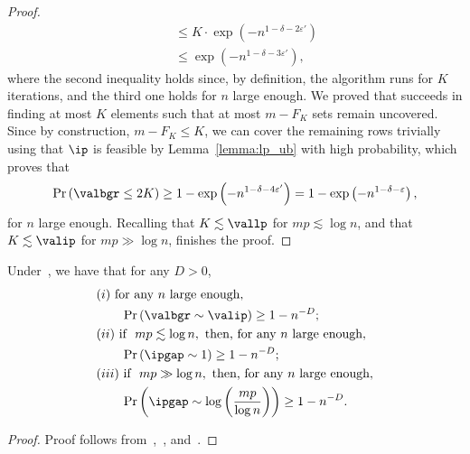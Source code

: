 \begin{proof}
\begin{align*}
&\quad \leq K \cdot \exp\left(- n^{1 - \delta - 2\varepsilon'}\right) \\
&\quad \leq \exp\left(- n^{1 - \delta - 3\varepsilon'} \right),
\end{align*}
where the second inequality holds since, by definition, the algorithm runs for $K$ iterations, and the third one holds for $n$ large enough. 
We proved that \bgreedy succeeds in finding at most $K$ elements such that at most $m - F_{K}$ sets remain uncovered. Since by construction, $m - F_{K} \leq K$, we can cover the remaining rows trivially using that \(\ip\) is feasible by Lemma~\ref{lemma:lp_ub} with high probability, which proves that 
\begin{equation*}
    \Pr \left(\valbgr \leq 2K\right) \geq 1 - \exp\left(-n^{1 - \delta - 4\varepsilon'}\right) =1 - \exp\left(-n^{1 - \delta - \varepsilon}\right) ,
\end{equation*}
for $n$ large enough. Recalling that \(K \lesssim \vallp\) for \(mp \lesssim \log n\), and that \(K \lesssim \valip\) for \(mp \gg \log n\), finishes the proof. 
\end{proof}

\begin{corollary}
\label{cor:ipgap_collected}
    Under~, we have that for any \(D > 0\),
    \begin{equation}
            \begin{aligned}
                &(i) \text{ for any } n \text{ large enough},\\ 
                &\qquad \Pr\left(\valbgr \sim \valip\right) \geq 1 - n^{-D}; \\
                &(ii) \text{ if } \  mp \lesssim \log n, \  \text{then, for any } n \text{ large enough},\\ 
                &\qquad \Pr\left(\ipgap \sim 1\right) \geq 1 - n^{-D}; \\
                &(iii) \text{ if } \ mp \gg \log n, \text{ then, for any } n \text{ large enough}, \\
                &\qquad\Pr\left(\ipgap \sim \log \left(\frac{mp}{\log n}\right)\right) \geq 1 - n^{-D}. \\
            \end{aligned}
        \end{equation}
\end{corollary}
\begin{proof}
Proof follows from~,~, and~.
\end{proof}

